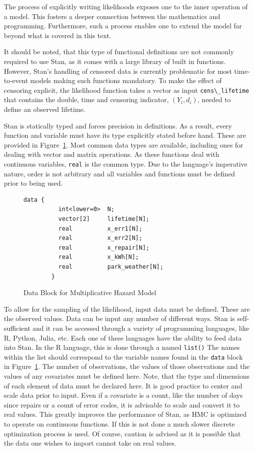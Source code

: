 The process of explicitly writing likelihoods exposes one to the inner operation of a model. This fosters a deeper connection between the mathematics and programming. Furthermore, such a process enables one to extend the model far beyond what is covered in this text.

It should be noted, that this type of functional definitions are not commonly required to use Stan, as it comes with a large library of built in functions\cite{StanDevelopmentTeam2016}. However, Stan's handling of censored data is currently problematic for most time-to-event models making such functions mandatory. To make the effect of censoring explicit, the likelihood function takes a vector as input \lstinline{cens\_lifetime} that contains the double, time and censoring indicator, $(Y_i,d_i)$, needed to define an observed lifetime. 

Stan is statically typed and forces precision in definitions. As a result, every function and variable must have its type explicitly stated before hand. These are provided in Figure~\ref{mhaz_data}. Most common data types are available, including ones for dealing with vector and matrix operations. As these functions deal with continuous variables, \lstinline{real} is the common type. Due to the language's imperative nature, order is not arbitrary and all variables and functions must be defined prior to being used. 


\begin{figure}[htbp]
    \centering
    \begin{lstlisting}[belowskip=-2 \baselineskip]
		data {
		  int<lower=0>  N;
		  vector[2]     lifetime[N];
		  real          x_err1[N];
		  real          x_err2[N];
		  real          x_repair[N];
		  real          x_kWh[N];
		  real          park_weather[N];
		}
    \end{lstlisting}
    \caption{Data Block for Multiplicative Hazard Model}
    \label{mhaz_data}
\end{figure}


To allow for the sampling of the likelihood, input data must be defined. These are the observed values. Data can be input any number of different ways. Stan is self-sufficient and it can be accessed through a variety of programming languages, like R, Python, Julia, etc. Each one of these languages have the ability to feed data into Stan. In the R language, this is done through a named \lstinline{list()} The names within the list should correspond to the variable names found in the \lstinline{data} block in Figure~\ref{mhaz_data}. The number of observations, the values of those observations and the values of any covariates must be defined here. Note, that the type and dimensions of each element of data must be declared here. It is good practice to center and scale data prior to input. Even if a covariate is a count, like the number of days since repairs or a count of error codes, it is advisable to scale and convert it to real values. This greatly improves the performance of Stan, as HMC is optimized to operate on continuous functions. If this is not done a much slower discrete optimization process is used. Of course, caution is advised as it is possible that the data one wishes to import cannot take on real values. 


